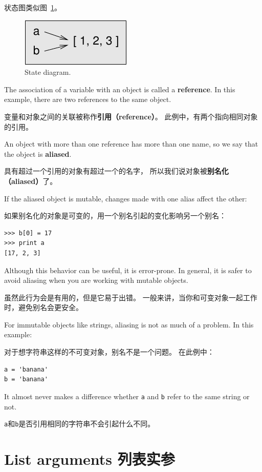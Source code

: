 \documentclass[10pt]{book}
\begin{document}
\begin{CJK}{UTF8}{gbsn}
状态图类似图~\ref{fig.list3}。

\begin{figure}
\centerline
{\includegraphics[scale=0.8]{figs/list3.pdf}}
\caption{State diagram.}
\label{fig.list3}
\end{figure}

The association of a variable with an object is called a {\bf
reference}.  In this example, there are two references to the same
object.

变量和对象之间的关联被称作{\bf 引用（reference）}。
此例中，有两个指向相同对象的引用。

An object with more than one reference has more
than one name, so we say that the object is {\bf aliased}.

具有超过一个引用的对象有超过一个的名字，
所以我们说对象被{\bf 别名化（aliased）}了。

If the aliased object is mutable, changes made with one alias affect
the other:

如果别名化的对象是可变的，用一个别名引起的变化影响另一个别名：

\begin{verbatim}
>>> b[0] = 17
>>> print a
[17, 2, 3]
\end{verbatim}
%
Although this behavior can be useful, it is error-prone.  In general,
it is safer to avoid aliasing when you are working with mutable
objects.

虽然此行为会是有用的，但是它易于出错。
一般来讲，当你和可变对象一起工作时，避免别名会更安全。

For immutable objects like strings, aliasing is not as much of a
problem.  In this example:

对于想字符串这样的不可变对象，别名不是一个问题。
在此例中：

\begin{verbatim}
a = 'banana'
b = 'banana'
\end{verbatim}
%
It almost never makes a difference whether {\tt a} and {\tt b} refer
to the same string or not.

{\tt a}和{\tt b}是否引用相同的字符串不会引起什么不同。


\section{List arguments 列表实参}
\label{list.arguments}


\end{CJK}
\end{document}
